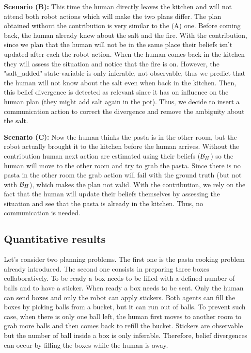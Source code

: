 \documentclass[letterpaper]{article} %
\begin{document}
\textbf{Scenario (B):} This time the human directly leaves the kitchen and will not attend both robot actions which will make the two plans differ. The plan obtained without the contribution is very similar to the (A) one. Before coming back, the human already knew about the salt and the fire. With the contribution, since we plan that the human will not be in the same place their beliefs isn't updated after each the robot action. When the human comes back in the kitchen they will assess the situation and notice that the fire is on. However, the "salt\_added" state-variable is only inferable, not observable, thus we predict that the human will not know about the salt even when back in the kitchen. Then, this belief divergence is detected as relevant since it has on influence on the human plan (they might add salt again in the pot). Thus, we decide to insert a communication action to correct the divergence and remove the ambiguity about the salt.

\textbf{Scenario (C):} Now the human thinks the pasta is in the other room, but the robot actually brought it to the kitchen before the human arrives. Without the contribution human next action are estimated using their beliefs ($\mathcal{B}_H$) so the human will move to the other room and try to grab the pasta. Since there is no pasta in the other room the grab action will fail with the ground truth (but not with $\mathcal{B}_H$), which makes the plan not valid. With the contribution, we rely on the fact that the human will update their beliefs themselves by assessing the situation and see that the pasta is already in the kitchen. Thus, no communication is needed.

\subsection{Quantitative results}

Let's consider two planning problems. The first one is the pasta cooking problem already introduced. The second one consists in preparing three boxes collaboratively. To be ready a box needs to be filled with a defined number of balls and to have a sticker. When ready a box needs to be sent. Only the human can send boxes and only the robot can apply stickers. Both agents can fill the boxes by picking balls from a bucket, but it can run out of balls. To prevent such case, when there is only one ball left, the human first moves to another room to grab more balls and then comes back to refill the bucket. Stickers are observable but the number of ball inside a box is only inferable.
Therefore, belief divergences can occur by filling the boxes while the human is away.
\end{document}
